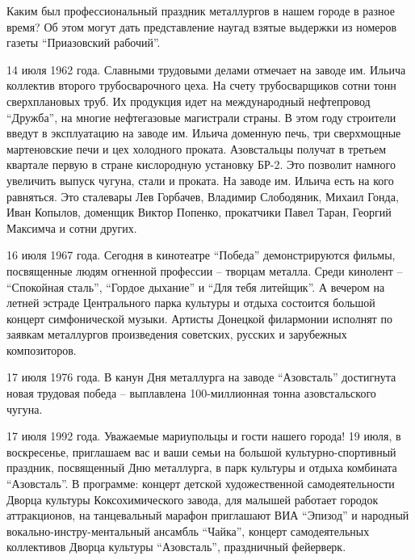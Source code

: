 Каким был профессиональный праздник металлургов в нашем городе в разное время?
Об этом могут дать представление наугад взятые выдержки из номеров газеты
\enquote{Приазовский рабочий}. 

14 июля 1962 года. Славными трудовыми делами отмечает на заводе им. Ильича
коллектив второго трубосварочного цеха. На счету трубосварщиков сотни тонн
сверхплановых труб. Их продукция идет на международный нефтепровод \enquote{Дружба}, на
многие нефтегазовые магистрали страны. В этом году строители введут в
эксплуатацию на заводе им. Ильича доменную печь, три сверхмощные мартеновские
печи и цех холодного проката. Азовстальцы получат в третьем квартале первую в
стране кислородную установку БР-2. Это позволит намного увеличить выпуск
чугуна, стали и проката. На заводе им. Ильича есть на кого равняться. Это
сталевары Лев Горбачев, Владимир Слободяник, Михаил Гонда, Иван Копылов,
доменщик Виктор Попенко, прокатчики Павел Таран, Георгий Максимча и сотни
других.

16 июля 1967 года. Сегодня в кинотеатре \enquote{Победа} демонстрируются фильмы,
посвященные людям огненной профессии – творцам металла. Среди кинолент –
\enquote{Спокойная сталь}, \enquote{Гордое дыхание} и \enquote{Для тебя литейщик}. А вечером на летней
эстраде Центрального парка культуры и отдыха состоится  большой концерт
симфонической музыки. Артисты Донецкой филармонии исполнят по заявкам
металлургов произведения советских, русских и зарубежных композиторов.

17 июля 1976 года. В канун Дня металлурга на заводе \enquote{Азовсталь} достигнута
новая трудовая победа – выплавлена 100-миллионная тонна азовстальского чугуна.

17 июля 1992 года. Уважаемые мариупольцы и гости нашего города! 19 июля, в
воскресенье, приглашаем вас и ваши семьи на  большой культурно-спортивный
праздник, посвященный Дню металлурга, в парк культуры и отдыха комбината
\enquote{Азовсталь}. В программе: концерт детской художественной самодеятельности
Дворца культуры Коксохимического завода, для малышей работает городок
аттракционов, на танцевальный марафон приглашают ВИА \enquote{Эпизод} и народный
вокально-инстру\hyp{}ментальный ансамбль \enquote{Чайка}, концерт самодеятельных коллективов
Дворца культуры \enquote{Азовсталь}, праздничный фейерверк.
